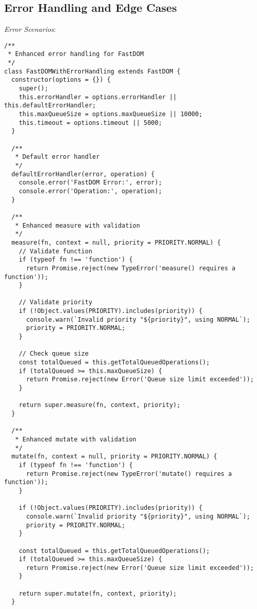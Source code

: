 \documentclass[11pt]{article}
\begin{document}
\subsection{Error Handling and Edge Cases}
\label{sec:orgec2a829}

\emph{Error Scenarios}:

\begin{verbatim}
/**
 * Enhanced error handling for FastDOM
 */
class FastDOMWithErrorHandling extends FastDOM {
  constructor(options = {}) {
    super();
    this.errorHandler = options.errorHandler || this.defaultErrorHandler;
    this.maxQueueSize = options.maxQueueSize || 10000;
    this.timeout = options.timeout || 5000;
  }
  
  /**
   * Default error handler
   */
  defaultErrorHandler(error, operation) {
    console.error('FastDOM Error:', error);
    console.error('Operation:', operation);
  }
  
  /**
   * Enhanced measure with validation
   */
  measure(fn, context = null, priority = PRIORITY.NORMAL) {
    // Validate function
    if (typeof fn !== 'function') {
      return Promise.reject(new TypeError('measure() requires a function'));
    }
    
    // Validate priority
    if (!Object.values(PRIORITY).includes(priority)) {
      console.warn(`Invalid priority "${priority}", using NORMAL`);
      priority = PRIORITY.NORMAL;
    }
    
    // Check queue size
    const totalQueued = this.getTotalQueuedOperations();
    if (totalQueued >= this.maxQueueSize) {
      return Promise.reject(new Error('Queue size limit exceeded'));
    }
    
    return super.measure(fn, context, priority);
  }
  
  /**
   * Enhanced mutate with validation
   */
  mutate(fn, context = null, priority = PRIORITY.NORMAL) {
    if (typeof fn !== 'function') {
      return Promise.reject(new TypeError('mutate() requires a function'));
    }
    
    if (!Object.values(PRIORITY).includes(priority)) {
      console.warn(`Invalid priority "${priority}", using NORMAL`);
      priority = PRIORITY.NORMAL;
    }
    
    const totalQueued = this.getTotalQueuedOperations();
    if (totalQueued >= this.maxQueueSize) {
      return Promise.reject(new Error('Queue size limit exceeded'));
    }
    
    return super.mutate(fn, context, priority);
  }
  

\end{verbatim}
\end{document}
